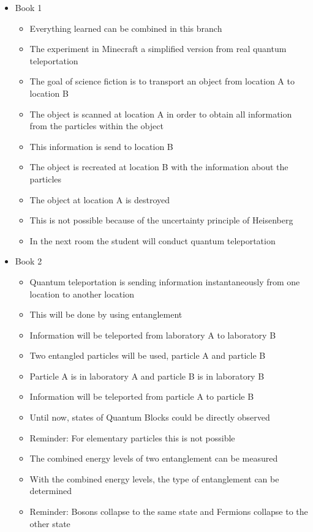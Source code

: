 \documentclass[11pt,twoside]{report} %
\begin{document}
\begin{itemize}
	\item Book 1
	\begin{itemize}
		\item Everything learned can be combined in this branch
		\item The experiment in Minecraft a simplified version from real quantum teleportation
		\item The goal of science fiction is to transport an object from location A to location B
		\item The object is scanned at location A in order to obtain all information from the particles within the object
		\item This information is send to location B
		\item The object is recreated at location B with the information about the particles
		\item The object at location A is destroyed
		\item This is not possible because of the uncertainty principle of Heisenberg
		\item In the next room the student will conduct quantum teleportation
	\end{itemize}
	\item Book 2
	\begin{itemize}
		\item Quantum teleportation is sending information instantaneously from one location to another location
		\item This will be done by using entanglement
		\item Information will be teleported from laboratory A to laboratory B
		\item Two entangled particles will be used, particle A and particle B
		\item Particle A is in laboratory A and particle B is in laboratory B
		\item Information will be teleported from particle A to particle B
		\item Until now, states of Quantum Blocks could be directly observed
		\item Reminder: For elementary particles this is not possible
		\item The combined energy levels of two entanglement can be measured
		\item With the combined energy levels, the type of entanglement can be determined
		\item Reminder: Bosons collapse to the same state and Fermions collapse to the other state

\end{itemize}
\end{itemize}
\end{document}
